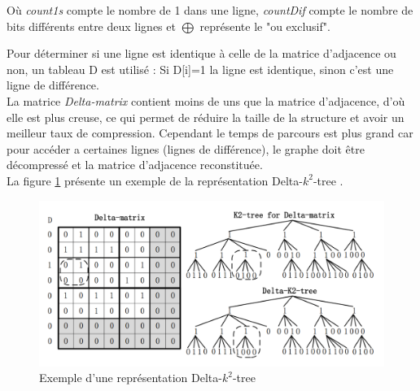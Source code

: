 Où \textit{count1s} compte le nombre de 1 dans une ligne, \textit{countDif} compte le nombre de bits différents entre deux lignes et $\bigoplus$ représente le "ou exclusif".

Pour déterminer si une ligne est identique à celle de la matrice d'adjacence ou non, un tableau D est utilisé : Si D[i]=1 la ligne est identique, sinon c'est une ligne de différence.\\
La matrice \textit{Delta-matrix} contient moins de uns que la matrice d'adjacence, d'où elle est plus creuse, ce qui permet de réduire la taille de la structure et avoir un meilleur taux de compression. Cependant le temps de parcours est plus grand car pour accéder a certaines lignes (lignes de différence), le graphe doit être décompressé et la matrice d'adjacence reconstituée.\\
La figure \ref{k2-trees-delta} présente un exemple de la représentation Delta-$k^2$-tree \citep{zhang2014delta}.


\begin{figure}[H]
\begin{center}
\includegraphics[height=150 pt, width=380 pt]{./ressources/image/k2-trees-delta.png} 
\end{center}
\caption{Exemple d'une représentation Delta-$k^2$-tree}
\label{k2-trees-delta}
\end{figure}

